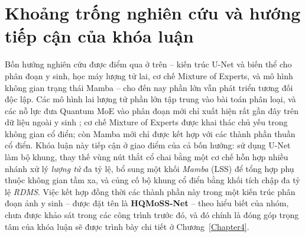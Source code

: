 \section{Khoảng trống nghiên cứu và hướng tiếp cận của khóa luận}
Bốn hướng nghiên cứu được điểm qua ở trên -- kiến trúc U-Net và biến thể cho phân đoạn y sinh, học máy lượng tử lai, cơ chế Mixture of Experts, và mô hình không gian trạng thái Mamba -- cho đến nay phần lớn vẫn phát triển tương đối độc lập. Các mô hình lai lượng tử phần lớn tập trung vào bài toán phân loại, và các nỗ lực đưa Quantum MoE vào phân đoạn mới chỉ xuất hiện rất gần đây trên dữ liệu ngoài y sinh \cite{hossain2026hqfnet}; cơ chế Mixture of Experts được khai thác chủ yếu trong không gian cổ điển; còn Mamba mới chỉ được kết hợp với các thành phần thuần cổ điển. Khóa luận này tiếp cận ở giao điểm của cả bốn hướng: sử dụng U-Net làm bộ khung, thay thế vùng nút thắt cổ chai bằng một cơ chế hỗn hợp nhiều nhánh xử lý \emph{lượng tử} đa tỷ lệ, bổ sung một khối \emph{Mamba} (LSS) để tổng hợp phụ thuộc không gian tầm xa, và củng cố bộ khung cổ điển bằng khối tích chập đa tỷ lệ \emph{RDMS}. Việc kết hợp đồng thời các thành phần này trong một kiến trúc phân đoạn ảnh y sinh -- được đặt tên là \textbf{HQMoSS-Net} -- theo hiểu biết của nhóm, chưa được khảo sát trong các công trình trước đó, và đó chính là đóng góp trọng tâm của khóa luận sẽ được trình bày chi tiết ở Chương~\ref{Chapter4}.